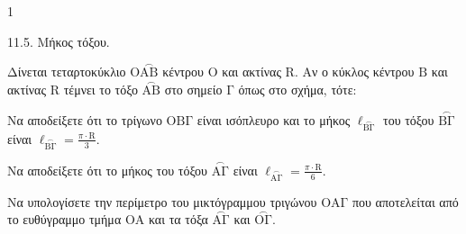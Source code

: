 \begin{ylh}{1}
    \item 11.5. Μήκος τόξου.
\end{ylh}
\begin{figure}
\centering
{}
\end{figure}

Δίνεται τεταρτοκύκλιο $\mathrm{O}\overset{\frown}{\mathrm{AB}}$ κέντρου $\mathrm{O}$ και ακτίνας $\mathrm{R}$. Αν ο κύκλος κέντρου $\mathrm{B}$ και ακτίνας $\mathrm{R}$ τέμνει το τόξο $\overset{\frown}{\mathrm{AB}}$ στο σημείο $\mathrm{\Gamma}$ όπως στο σχήμα, τότε:
\begin{alist}
    \item Να αποδείξετε ότι το τρίγωνο $\mathrm{OB\Gamma}$ είναι ισόπλευρο και το μήκος $\ell_{\overset{\frown}{\mathrm{B\Gamma}}}$ του τόξου $\overset{\frown}{\mathrm{B\Gamma}}$ είναι $\ell_{\overset{\frown}{\mathrm{B\Gamma}}} = \frac{\pi \cdot \mathrm{R}}{3}$. 
    \item Να αποδείξετε ότι το μήκος του τόξου $\overset{\frown}{\mathrm{A\Gamma}}$ είναι $\ell_{\overset{\frown}{\mathrm{A\Gamma}}} = \frac{\pi \cdot \mathrm{R}}{6}$. 
    \item Να υπολογίσετε την περίμετρο του μικτόγραμμου τριγώνου $\mathrm{OA\Gamma}$ που αποτελείται από το ευθύγραμμο τμήμα $\mathrm{OA}$ και τα τόξα $\overset{\frown}{\mathrm{A\Gamma}}$ και $\overset{\frown}{\mathrm{O\Gamma}}$. 
\end{alist}